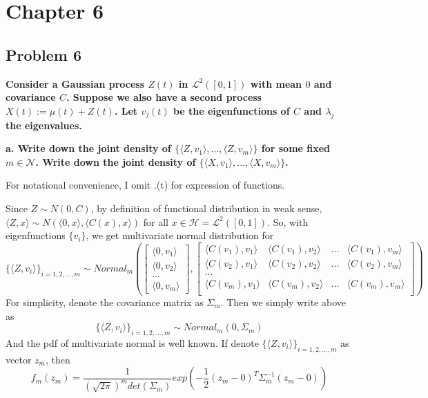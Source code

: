 \documentclass{article}
\begin{document}
\section{Chapter 6}
\subsection{Problem 6}
\textbf{
Consider a Gaussian process $Z(t)$ in $\mathcal{L}^2([0,1])$ with mean $0$ and covariance $C$.
Suppose we also have a second process $X(t):=\mu(t)+Z(t)$.
Let $v_j(t)$ be the eigenfunctions of $C$ and $\lambda_j$ the eigenvalues.
}

\textbf{
a. Write down the joint density of $\{\langle Z, v_1\rangle,...,\langle Z, v_m\rangle\}$ for some fixed $m\in\mathcal{N}$.
Write down the joint density of $\{\langle X, v_1\rangle,...,\langle X, v_m\rangle\}$.
}

For notational convenience, I omit .(t) for expression of functions.

Since $Z \sim N(0, C)$, by definition of functional distribution in weak sense,
\(\langle Z, x\rangle \sim N(\langle 0,x \rangle, \langle C(x),x\rangle)\) for all $x\in \mathcal{H}=\mathcal{L}^2([0,1])$.
So, with eigenfunctions $\{v_i\}$, we get multivariate normal distribution for
\[\{\langle Z, v_i\rangle\}_{i=1,2,...,m} \sim Normal_m(
\begin{bmatrix}
    \langle 0,v_1 \rangle \\
    \langle 0,v_2 \rangle \\
    ... \\
    \langle 0,v_m \rangle
\end{bmatrix}
,
\begin{bmatrix}
    \langle C(v_1),v_1 \rangle & \langle C(v_1),v_2 \rangle & ... & \langle C(v_1),v_m \rangle \\
    \langle C(v_2),v_1 \rangle & \langle C(v_2),v_2 \rangle & ... & \langle C(v_2),v_m \rangle \\
    ... \\
    \langle C(v_m),v_1 \rangle & \langle C(v_m),v_2 \rangle & ... & \langle C(v_m),v_m \rangle \\
\end{bmatrix}
)\]
For simplicity, denote the covariance matrix as $\Sigma_m$. Then we simply write above as
\[\{\langle Z, v_i\rangle\}_{i=1,2,...,m} \sim Normal_m(0,\Sigma_m)\]
And the pdf of multivariate normal is well known. 
If denote \(\{\langle Z, v_i\rangle\}_{i=1,2,...,m}\) as vector $z_m$, then
\[
    f_m(z_m) = \frac{1}{(\sqrt{2\pi})^m det(\Sigma_m)}exp{(-\frac{1}{2}(z_m-0)^T\Sigma_m^{-1}(z_m-0))}
\]
\end{document}
